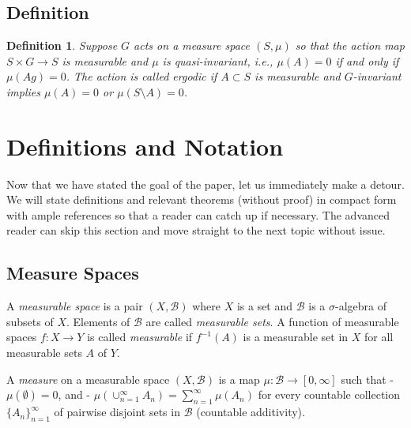 \documentclass[
  12pt
]{article}
\theoremstyle{break}
\newtheorem{defn}{Definition}[thm]
\theoremstyle{plain}
\begin{document}
  \hypertarget{definition}{%
  \subsection{Definition}\label{definition}}

  \begin{defn}
    Suppose $G$ acts on a measure space $(S, \mu)$ so that the action
    map $S \times G \rightarrow S$ is measurable and $\mu$ is
    quasi-invariant, i.e., $\mu(A) = 0$ if and only if $\mu(Ag) = 0$.
    The action is called ergodic if $A \subset S$ is measurable and
    $G$-invariant implies $\mu(A) = 0$ or $\mu(S\setminus A) = 0$.
  \end{defn}



\hypertarget{definitions-and-notation}{%
\section{Definitions and Notation}\label{definitions-and-notation}}


  Now that we have stated the goal of the paper, let us immediately make a
  detour. We will state definitions and relevant theorems (without proof)
  in compact form with ample references so that a reader can catch up if
  necessary. The advanced reader can skip this section and move straight
  to the next topic without issue.




  \hypertarget{measure-spaces}{%
  \subsection{Measure Spaces}\label{measure-spaces}}

  A \emph{measurable space} is a pair $(X, \mathscr{B})$ where $X$ is
  a set and $\mathscr{B}$ is a $\sigma$-algebra of subsets of $X$.
  Elements of $\mathscr{B}$ are called \emph{measurable sets}. A
  function of measurable spaces $f: X \rightarrow Y$ is called
  \emph{measurable} if $f^{-1}(A)$ is a measurable set in $X$ for all
  measurable sets $A$ of $Y$.

  A \emph{measure} on a measurable space $(X, \mathscr{B})$ is a map
  $\mu: \mathscr{B} \rightarrow [0, \infty]$ such that -
  $\mu(\emptyset) = 0$, and -
  $\mu(\cup_{n=1}^{\infty} A_n) = \sum_{n=1}^{\infty} \mu(A_n)$ for
  every countable collection $\{A_n\}_{n=1}^{\infty}$ of pairwise
  disjoint sets in $\mathscr{B}$ (countable additivity).
\end{document}

